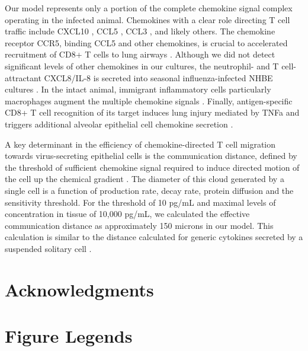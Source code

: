 \documentclass[10pt]{article}
\begin{document}
Our model represents only a portion of the complete chemokine signal complex operating in the infected animal.  Chemokines with a clear role directing T cell traffic include CXCL10 \cite{Dufour2002}, CCL5 \cite{Kawai1999}, CCL3 \cite{Kawai1999}, and likely others.  The chemokine receptor CCR5, binding CCL5 and other chemokines, is crucial to accelerated recruitment of CD8+ T cells to lung airways \cite{Kohlmeier2008}.  Although we did not detect significant levels of other chemokines in our cultures, the neutrophil- and T cell-attractant CXCL8/IL-8 is secreted into seasonal influenza-infected NHBE cultures \cite{Matsukura1996, Arndt2002}.  In the intact animal, immigrant inflammatory cells particularly macrophages augment the multiple chemokine signals \cite{Julkunen2000}.  Finally, antigen-specific CD8+ T cell recognition of its target induces lung injury mediated by TNFa and triggers additional alveolar epithelial cell chemokine secretion \cite{Zhao2000}.

A key determinant in the efficiency of chemokine-directed T cell migration towards virus-secreting epithelial cells is the communication distance, defined by the threshold of sufficient chemokine signal required to induce directed motion of the cell up the chemical gradient \cite{Thelen2008}.  The diameter of this cloud generated by a single cell is a function of production rate, decay rate, protein diffusion and the sensitivity threshold.  For the threshold of 10 pg/mL and maximal levels of concentration in tissue of 10,000 pg/mL, we calculated the effective communication distance as approximately 150 microns in our model.  This calculation is similar to the distance calculated for generic cytokines secreted by a suspended solitary cell \cite{Francis1997}.




\section*{Acknowledgments}




\section*{Figure Legends}
\end{document}
